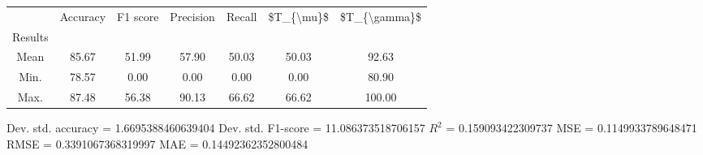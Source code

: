 \begin{tabular}{|c|c|c|c|c|c|c|}
\toprule
{} &  Accuracy &  F1 score &  Precision &  Recall &  \$T\_\{\textbackslash mu\}\$ &  \$T\_\{\textbackslash gamma\}\$ \\
Results &           &           &            &         &            &               \\
\hline
Mean    &     85.67 &     51.99 &      57.90 &   50.03 &      50.03 &         92.63 \\
Min.    &     78.57 &      0.00 &       0.00 &    0.00 &       0.00 &         80.90 \\
Max.    &     87.48 &     56.38 &      90.13 &   66.62 &      66.62 &        100.00 \\
\bottomrule
\end{tabular}

 Dev. std. accuracy = 1.6695388460639404
 Dev. std. F1-score = 11.086373518706157
 $R^2$ = 0.159093422309737
 MSE = 0.1149933789648471
 RMSE = 0.3391067368319997
 MAE = 0.14492362352800484